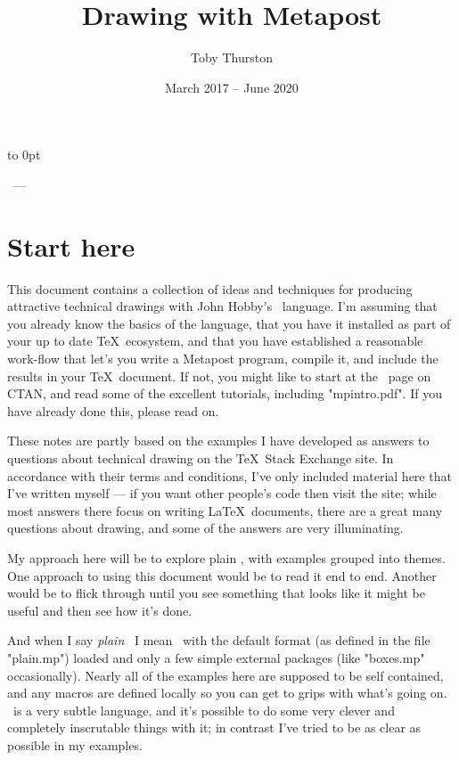 \documentclass[a4paper,landscape]{article}
\title{Drawing with Metapost}
\author{Toby Thurston}
\date{March 2017 – June 2020}
\begin{document}
\pagestyle{empty}
\raggedbottom
\makeatletter
\moveright 6in\vbox to
0pt{\vskip23pt\noindent\sffamily{\Large\bfseries\@title}\par\bigskip
    \noindent\@author\ --- \@date\par
    \bigskip
\vss}
\makeatother
\section{Start here}

This document contains a collection of ideas and techniques for producing attractive
technical drawings with John Hobby’s \MP\ language.  I’m assuming that you already
know the basics of the language, that you have it installed as part of your up to
date \TeX\ ecosystem, and that you have established a reasonable work-flow that
let’s you write a Metapost program, compile it, and include the results in your
\TeX\ document.  If not, you might like to start at the \MP\ page on CTAN, and read
some of the excellent tutorials, including "mpintro.pdf".  If you have already done
this, please read on.

These notes are partly based on the examples I have developed as answers
to questions about technical drawing on the \TeX\ Stack Exchange site.  In
accordance with their terms and conditions, I’ve only included material here that
I’ve written myself --- if you want other people’s code then visit the site;
while most answers there focus on writing \LaTeX\ documents, there are a great
many questions about drawing, and some of the answers are very illuminating.

My approach here will be to explore plain \MP, with examples grouped
into themes.  One approach to using this document would be to read it end to end.
Another would be to flick through until you see something that looks like it might
be useful and then see how it’s done.

And when I say \textit{plain} \MP\ I mean \MP\ with the default format (as defined
in the file "plain.mp") loaded and only a few simple external packages (like
"boxes.mp" occasionally).  Nearly all of the examples here are supposed to be self
contained, and any macros are defined locally so you can get to grips with what’s
going on.  \MP\ is a very subtle language, and it’s possible to do some very clever
and completely inscrutable things with it;  in contrast I’ve tried to be as clear as
possible in my examples.
\end{document}
